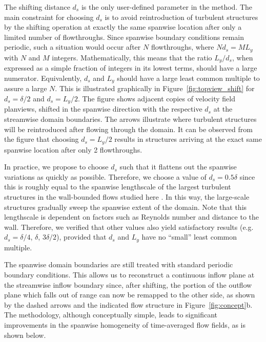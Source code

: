 	The shifting distance $d_s$ is the only user-defined parameter in the method. The main constraint for choosing $d_s$ is to avoid
	reintroduction of turbulent structures by the shifting operation at exactly the same spanwise location after only a limited number of
	flowthroughs. Since spanwise boundary conditions remain periodic, such a situation would occur after $N$ flowthroughs, where $N d_s = M L_y$
	with $N$ and $M$ integers. Mathematically, this means that the ratio $L_y/d_s$, when expressed as a simple fraction of integers in its lowest
	terms, should have a large numerator. Equivalently, $d_s$ and $L_y$ should have a large least common multiple to assure a large $N$. This is
	illustrated graphically in Figure~\ref{fig:topview_shift} for $d_s = \delta/2$ and $d_s = L_y/2$. The figure shows adjacent copies of velocity field planviews, shifted in the spanwise direction with the respective $d_s$ at the streamwise domain boundaries. The arrows illustrate where turbulent structures will be reintroduced after flowing through the domain. It can be observed from the figure that choosing $d_s = L_y/2$ results in structures arriving at the exact same spanwise location after only 2 flowthroughs.
	
	In practice, we propose to choose $d_s$ such that it flattens out the spanwise variations as quickly as possible. 
	Therefore, we choose a value of $d_s = 0.5\delta$ since this is roughly equal to the spanwise lengthscale of the largest turbulent structures in the wall-bounded flows studied here \citep{tomkins2003spanwise, hutchins2007evidence,fang2015large}. 
	In this way, the large-scale structures gradually sweep the spanwise extent of the domain. 
	Note that this lengthscale is dependent on factors such as Reynolds number and distance to the wall. 
	Therefore, we verified that other values also yield satisfactory results (e.g. $d_s = \delta/4$, $\delta$, $3\delta/2$), provided that $d_s$ and $L_y$ have no ``small'' least common multiple.
	
	The spanwise domain boundaries are still treated with standard periodic boundary conditions. This allows us to reconstruct a continuous inflow plane at the streamwise inflow boundary since, after shifting, the portion of the outflow plane which falls out of range can now be remapped to the other side, as shown by the dashed arrows and the indicated flow structure in Figure~\ref{fig:concept}b. The methodology, although conceptually simple, leads to significant improvements in the spanwise homogeneity of time-averaged flow fields, as is shown below.
	
